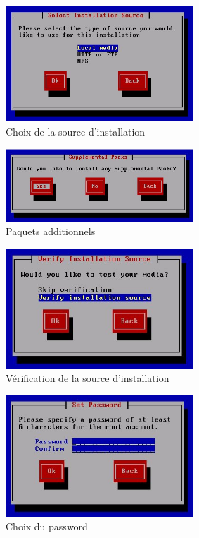 \begin{figure}
\begin{center}
\includegraphics[width=200pt]{images/4.png}
\end{center}
\caption{Choix de la source d'installation}
\end{figure}
\begin{figure}
\begin{center}
\includegraphics[width=200pt]{images/5.png}
\end{center}
\caption{Paquets additionnels}
\end{figure}
\begin{figure}
\begin{center}
\includegraphics[width=200pt]{images/6.png}
\end{center}
\caption{Vérification de la source d'installation}
\end{figure}
\begin{figure}
\begin{center}
\includegraphics[width=200pt]{images/7.png}
\end{center}
\caption{Choix du password}
\end{figure}
